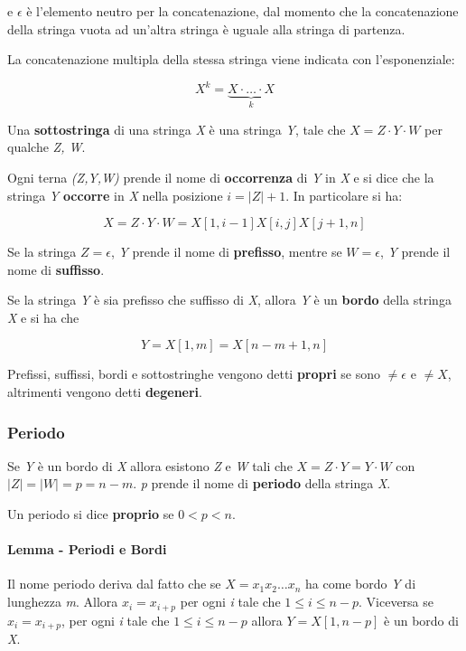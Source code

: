e $\epsilon$ è l'elemento neutro per la concatenazione, dal momento
che la concatenazione della stringa vuota ad un'altra stringa è uguale
alla stringa di partenza.

La concatenazione multipla della stessa stringa viene indicata con
l'esponenziale:

$$
X^k = \underbrace{X \cdot \ldots \cdot X}_{k}
$$

Una \textbf{sottostringa} di una stringa \emph{X} è una stringa
\emph{Y}, tale che
$X = Z \cdot Y \cdot W$ per
qualche \emph{Z, W}.

Ogni terna \emph{(Z,Y,W)} prende il nome di \textbf{occorrenza} di
\emph{Y} in \emph{X} e si dice che la stringa \emph{Y} \textbf{occorre}
in \emph{X} nella posizione $i = |Z| + 1$.
In particolare si ha:

$$
X = Z \cdot Y \cdot W = X[1,i-1]X[i,j]X[j+1,n]
$$

Se la stringa $Z = \epsilon$, \emph{Y} prende il nome di
\textbf{prefisso}, mentre se $W=\epsilon$, \emph{Y} prende il nome
di \textbf{suffisso}.

Se la stringa \emph{Y} è sia prefisso che suffisso di \emph{X}, allora
\emph{Y} è un \textbf{bordo} della stringa \emph{X} e si ha che

$$
Y = X[1,m] = X[n-m+1,n]
$$

Prefissi, suffissi, bordi e sottostringhe vengono detti \textbf{propri}
se sono $\neq \epsilon$ e $\neq X$, altrimenti vengono detti
\textbf{degeneri}.

\subsubsection{Periodo}\label{periodo}

Se \emph{Y} è un bordo di \emph{X} allora esistono \emph{Z} e \emph{W}
tali che $X = Z \cdot Y = Y \cdot W$ con
$|Z| =|W| = p = n - m$.
\emph{p} prende il nome di \textbf{periodo} della stringa \emph{X}.

Un periodo si dice \textbf{proprio} se $0 < p <n$.

\paragraph{Lemma - Periodi e Bordi}\label{lemma---origine-del-periodo}

Il nome periodo deriva dal fatto che se $X = x_1x_2\ldots x_n$ ha
come bordo \emph{Y} di lunghezza \emph{m}. Allora $x_i = x_{i+p}$ per
ogni \emph{i} tale che $1 \leq i \leq n-p$. 
Viceversa se $x_i = x_{i+p}$, per ogni \emph{i} tale che $1 \leq i \leq n - p$ allora
$Y = X[1,n-p]$ è un bordo di \emph{X}.

